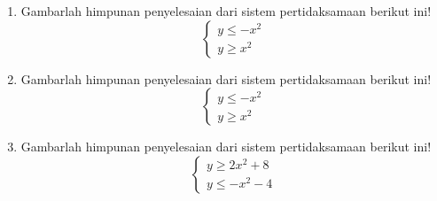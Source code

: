 \documentclass[fleqn, a4paper, 12pt]{article} %
\begin{document}
\begin{enumerate}
		\item Gambarlah himpunan penyelesaian dari sistem pertidaksamaan berikut ini!
			\[\left\{\begin{array}{l}
				y \leq -x^2 \\
				y \geq x^2
			\end{array}\right.\]
		\item Gambarlah himpunan penyelesaian dari sistem pertidaksamaan berikut ini!
			\[\left\{\begin{array}{l}
				y \leq -x^2 \\
				y \geq x^2
			\end{array}\right.\]
		\item Gambarlah himpunan penyelesaian dari sistem pertidaksamaan berikut ini!
			\[\left\{\begin{array}{l}
				y \geq 2x^2 + 8 \\
				y \leq -x^2 - 4
			\end{array}\right.\]
	\end{enumerate}
\end{document}
